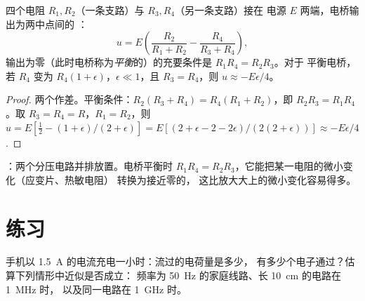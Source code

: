 \begin{proposition}[惠斯通电桥]\label{prop:b1:dc-circuits:wheatstone}
四个电阻 $R_1, R_2$（一条支路）与 $R_3, R_4$（另一条支路）接在
电源 $E$ 两端，电桥输出为两中点间的
：
\[
u = E\left(\frac{R_2}{R_1 + R_2} - \frac{R_4}{R_3 + R_4}\right),
\]
输出为零（此时电桥称为\emph{平衡}的）的充要条件是 $R_1R_4 = R_2R_3$。对于
平衡电桥，若 $R_4$ 变为 $R_4(1 + \epsilon)$，$\epsilon
\ll 1$，且 $R_3 = R_4$，则 $u \approx -E\epsilon/4$。
\end{proposition}

\begin{proof}
两个作差。平衡条件：$R_2(R_3 + R_4) = R_4(R_1 +
R_2)$，即 $R_2R_3 = R_1R_4$。取 $R_3 = R_4 = R$，$R_1 = R_2$，则
$u = E[\tfrac12 - (1 + \epsilon)/(2 + \epsilon)] = E[(2 + \epsilon - 2 -
2\epsilon)/(2(2 + \epsilon))] \approx -E\epsilon/4$.
\end{proof}

\begin{omfigure}

{\small {}：两个分压电路并排放置。电桥平衡时
$R_1R_4 = R_2R_3$，它能把某一电阻的微小变化（应变片、热敏电阻）
转换为接近零的，
这比放大大上的微小变化容易得多。}
\end{omfigure}

\section{练习}

\begin{exercise}[$\star$]\label{exo:b1:dc-circuits:1}
手机以 \qty{1.5}{A} 的电流充电一小时：流过的电荷量是多少，
有多少个电子通过？估算下列情形中近似是否成立：
频率为 \qty{50}{Hz} 的家庭线路、长 \qty{10}{cm} 的电路在 \qty{1}{MHz} 时，
以及同一电路在 \qty{1}{GHz} 时。
\end{exercise}

